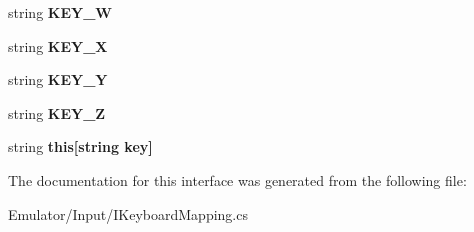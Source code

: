 \begin{DoxyCompactItemize}
\item 
\hypertarget{interface_snowflake_1_1_emulator_1_1_input_1_1_i_keyboard_mapping_a7f1009630dd9f45ab654e9d6ec15443b}{}string {\bfseries K\+E\+Y\+\_\+\+W}\label{interface_snowflake_1_1_emulator_1_1_input_1_1_i_keyboard_mapping_a7f1009630dd9f45ab654e9d6ec15443b}

\item 
\hypertarget{interface_snowflake_1_1_emulator_1_1_input_1_1_i_keyboard_mapping_a1c934f185bc8c81bcb2561696669aeb6}{}string {\bfseries K\+E\+Y\+\_\+\+X}\label{interface_snowflake_1_1_emulator_1_1_input_1_1_i_keyboard_mapping_a1c934f185bc8c81bcb2561696669aeb6}

\item 
\hypertarget{interface_snowflake_1_1_emulator_1_1_input_1_1_i_keyboard_mapping_a047320b9b90340058230e71e5e8bc8cb}{}string {\bfseries K\+E\+Y\+\_\+\+Y}\label{interface_snowflake_1_1_emulator_1_1_input_1_1_i_keyboard_mapping_a047320b9b90340058230e71e5e8bc8cb}

\item 
\hypertarget{interface_snowflake_1_1_emulator_1_1_input_1_1_i_keyboard_mapping_a3a63dd37ac5f44e985ae7862f01bd266}{}string {\bfseries K\+E\+Y\+\_\+\+Z}\label{interface_snowflake_1_1_emulator_1_1_input_1_1_i_keyboard_mapping_a3a63dd37ac5f44e985ae7862f01bd266}

\item 
\hypertarget{interface_snowflake_1_1_emulator_1_1_input_1_1_i_keyboard_mapping_a816f10ab356be385e671b26a746e770b}{}string {\bfseries this\mbox{[}string key\mbox{]}}\label{interface_snowflake_1_1_emulator_1_1_input_1_1_i_keyboard_mapping_a816f10ab356be385e671b26a746e770b}

\end{DoxyCompactItemize}


The documentation for this interface was generated from the following file\+:\begin{DoxyCompactItemize}
\item 
Emulator/\+Input/I\+Keyboard\+Mapping.\+cs\end{DoxyCompactItemize}
